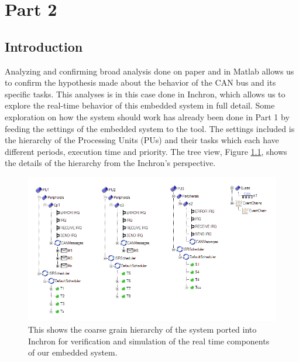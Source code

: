 \chapter{Part 2}


\section{Introduction}

Analyzing and confirming broad analysis done on paper and in Matlab allows us to confirm the hypothesis made about the behavior of the CAN bus and its specific tasks. This analyses is in this case done in Inchron, which allows us to explore the real-time behavior of this embedded system in full detail. Some exploration on how the system should work has already been done in Part 1 by feeding the settings of the embedded system to the tool. The settings included is the hierarchy of the Processing Units (PUs) and their tasks which each have different periods, execution time and priority. The tree view, Figure \ref{fig:treeCAN}, shows the details of the hierarchy from the Inchron's perspective.

\begin{figure}[h!]
	\begin{center}
		\includegraphics[width=0.9\linewidth]{img/treeCAN}
		\caption{This shows the coarse grain hierarchy of the system ported into Inchron for verification and simulation of the real time components of our embedded system.}
		\label{fig:treeCAN}
	\end{center}
\end{figure}




